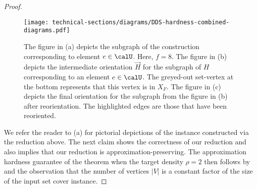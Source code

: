 \documentclass{article}
\begin{document}
\begin{proof}
    \iffalse
\begin{figure}
    \centering
\begin{minipage}{0.45\textwidth}
        \centering
        \texttt{[image: technical-sections/diagrams/Apx-Hardness-Diagram-beta-atmost-half.pdf]} \caption{The subgraph of the instance constructed from the reduction corresponding to element $e \in \calU$. Here, $f = 8$ and $\beta = 1/4$.}
        \label{fig:construction:first}
    \end{minipage}
    \hfill
\begin{minipage}{0.45\textwidth}
        \centering
        \texttt{[image: technical-sections/diagrams/Apx-Hardness-Diagram-beta-atleast-half.pdf]} \caption{The subgraph of the instance constructed from the reduction corresponding to element $e \in \calU$. Here, $f = 8$ and $\beta \geq 1/2$.}
        \label{fig:construction:second}
    \end{minipage}
\end{figure}
\fi
\begin{figure}
    \centering
\texttt{[image: technical-sections/diagrams/DDS-hardness-combined-diagrams.pdf]}
    \caption{The figure in (a) depicts the subgraph of the construction corresponding to element $e \in \calU$. Here, $f = 8$. The figure in (b) depicts the  intermediate orientation $\vec{H}$ for the subgraph of $H$ corresponding to an element $e \in \calU$. The greyed-out set-vertex at the bottom represents that this vertex is in $X_F$. The figure in (c) depicts the final orientation for the subgraph from the figure in (b) after reorientation. The highlighted edges are those that have been reoriented.}
    \label{fig:gadget-construction}
\end{figure}

    We refer the reader to (a) for pictorial depictions of the instance constructed via the reduction above. The next claim shows the correctness of our reduction and also implies that our reduction is approximation-preserving. The approximation hardness guarantee of the theorem when the target density $\rho = 2$ then follows by  and the observation that the number of vertices $|V|$ is a constant factor of the size of the input set cover instance.


\end{proof}
\end{document}
